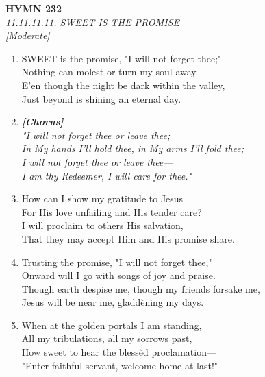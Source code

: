 \newpage
\begin{center}
    {\Large \textbf{HYMN 232}}
    \\
    \textit{11.11.11.11. SWEET IS THE PROMISE}
    \\
    \textit{\small [Moderate]}
\end{center}
\vspace{1em}

\begin{enumerate}
    \item SWEET is the promise, "I will not forget thee;" \\
        Nothing can molest or turn my soul away. \\
        E'en though the night be dark within the valley, \\
        Just beyond is shining an eternal day.

    \item[] \vspace{0.4em}
    \textbf{\textit{[Chorus]}} \\
    \textit{"I will not forget thee or leave thee;} \\
    \textit{In My hands I'll hold thee, in My arms I'll fold thee;} \\
    \textit{I will not forget thee or leave thee---} \\
    \textit{I am thy Redeemer, I will care for thee."}
    \vspace{0.4em}

    \item How can I show my gratitude to Jesus \\
        For His love unfailing and His tender care? \\
        I will proclaim to others His salvation, \\
        That they may accept Him and His promise share.

    \item Trusting the promise, "I will not forget thee," \\
        Onward will I go with songs of joy and praise. \\
        Though earth despise me, though my friends forsake me, \\
        Jesus will be near me, gladd\`ening my days.

    \item When at the golden portals I am standing, \\
        All my tribulations, all my sorrows past, \\
        How sweet to hear the bless\`ed proclamation--- \\
        "Enter faithful servant, welcome home at last!"

\end{enumerate}

